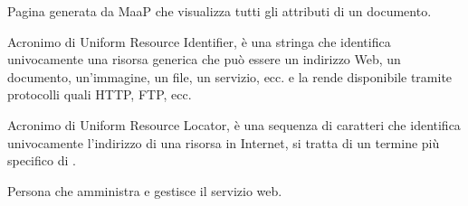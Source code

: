 
	Pagina generata da MaaP che visualizza tutti gli attributi di un documento.


	Acronimo di Uniform Resource Identifier, è una stringa che identifica univocamente una risorsa generica che può essere un indirizzo Web, un documento, un'immagine, un file, un servizio, ecc. e la rende disponibile tramite protocolli quali HTTP, FTP, ecc.

	Acronimo di Uniform Resource Locator,  è una sequenza di caratteri che identifica univocamente l'indirizzo di una risorsa in Internet, si tratta di un termine più specifico di .


	Persona che amministra e gestisce il servizio web.


